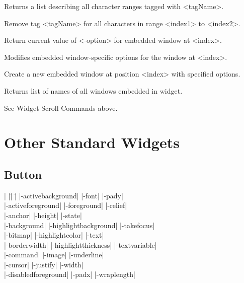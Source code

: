 \begin{enum}{1cm}
Returns a list describing all character ranges tagged with <tagName>.

Remove tag <tagName> for all characters in range <index1> to <index2>.

Return current value of <-option> for embedded window at <index>.

Modifies embedded window-specific options for the window at <index>.

Create a new embedded window at position <index> with specified options.

Returns list of names of all windows embedded in widget.

See Widget Scroll Commands above.

\end{enum}

\newpage{





}
\section{Other Standard Widgets}

\subsection*{Button}
\vspace{-4pt}
\begin{tabbing}
|                   |\=|                     |\= \kill
|-activebackground| \> |-font|               \> |-pady| \\
|-activeforeground| \> |-foreground|         \> |-relief| \\
|-anchor|           \> |-height|             \> |-state| \\
|-background|       \> |-highlightbackground|\> |-takefocus| \\
|-bitmap|           \> |-highlightcolor|     \> |-text| \\        
|-borderwidth|      \> |-highlightthickness| \> |-textvariable| \\
|-command|          \> |-image|              \> |-underline| \\   
|-cursor|	    \> |-justify|            \> |-width| \\       
|-disabledforeground| \> |-padx| 	     \> |-wraplength| \\  
\end{tabbing}


